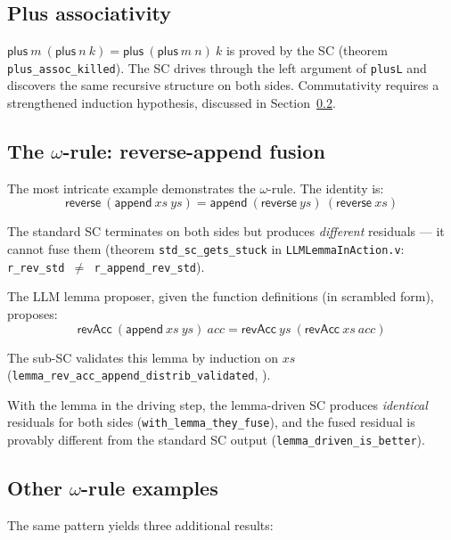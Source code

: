 \subsection{Plus associativity}

$\mathsf{plus}\ m\ (\mathsf{plus}\ n\ k) = \mathsf{plus}\ (\mathsf{plus}\ m\ n)\ k$
is proved by the SC (theorem \texttt{plus\_assoc\_killed}).  The SC drives
through the left argument of \texttt{plusL} and discovers the same recursive
structure on both sides.  Commutativity requires a strengthened
induction hypothesis, discussed in Section~\ref{sec:reverse-append}.

\subsection{The $\omega$-rule: reverse-append fusion}
\label{sec:reverse-append}

The most intricate example demonstrates the $\omega$-rule.
The identity is:
\[
  \mathsf{reverse}\ (\mathsf{append}\ \mathit{xs}\ \mathit{ys})
  = \mathsf{append}\ (\mathsf{reverse}\ \mathit{ys})\ (\mathsf{reverse}\ \mathit{xs})
\]

The standard SC terminates on both sides but produces
\emph{different} residuals --- it cannot fuse them (theorem
\texttt{std\_sc\_gets\_stuck} in \texttt{LLMLemmaInAction.v}:
\texttt{r\_rev\_std $\neq$ r\_append\_rev\_std}).

The LLM lemma proposer, given the function definitions (in scrambled form),
proposes:
\[
  \mathsf{revAcc}\ (\mathsf{append}\ \mathit{xs}\ \mathit{ys})\ \mathit{acc}
  = \mathsf{revAcc}\ \mathit{ys}\ (\mathsf{revAcc}\ \mathit{xs}\ \mathit{acc})
\]

The sub-SC validates this lemma by induction on $\mathit{xs}$
(\texttt{lemma\_rev\_acc\_append\_distrib\_validated}, \vmcompute{}).

With the lemma in the driving step, the lemma-driven SC produces
\emph{identical} residuals for both sides (\texttt{with\_lemma\_they\_fuse}),
and the fused residual is provably different from the standard SC output
(\texttt{lemma\_driven\_is\_better}).

\subsection{Other $\omega$-rule examples}

The same pattern yields three additional results:

